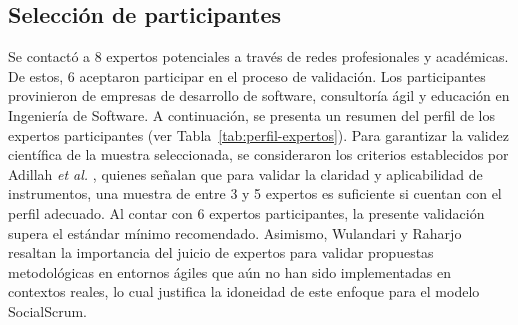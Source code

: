 \subsection{Selección de participantes}
Se contactó a 8 expertos potenciales a través de redes profesionales y académicas. De estos, 6 aceptaron participar en el proceso de validación. Los participantes provinieron de empresas de desarrollo de software, consultoría ágil y educación en Ingeniería de Software. A continuación, se presenta un resumen del perfil de los expertos participantes (ver Tabla~\ref{tab:perfil-expertos}). Para garantizar la validez científica de la muestra seleccionada, se consideraron los criterios establecidos por Adillah \textit{et al.} \cite{Adillah2022}, quienes señalan que para validar la claridad y aplicabilidad de instrumentos, una muestra de entre 3 y 5 expertos es suficiente si cuentan con el perfil adecuado. Al contar con 6 expertos participantes, la presente validación supera el estándar mínimo recomendado. Asimismo, Wulandari y Raharjo \cite{wulandari2023ifejm} resaltan la importancia del juicio de expertos para validar propuestas metodológicas en entornos ágiles que aún no han sido implementadas en contextos reales, lo cual justifica la idoneidad de este enfoque para el modelo SocialScrum.

\begingroup
\scriptsize
\renewcommand{\arraystretch}{1.4}
\setlength{\tabcolsep}{3pt}


